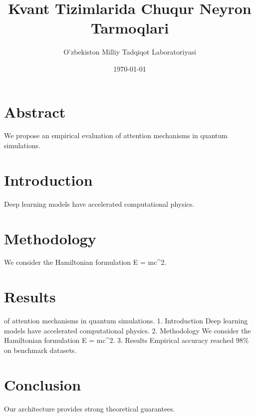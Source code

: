 \documentclass[11pt,a4paper]{article}
\title{Kvant Tizimlarida Chuqur Neyron Tarmoqlari}
\author{O'zbekiston Milliy Tadqiqot Laboratoriyasi}
\date{\today}
\begin{document}
\maketitle

\section{Abstract}

We propose an empirical evaluation of attention mechanisms in quantum simulations.

\section{Introduction}

Deep learning models have accelerated computational physics.

\section{Methodology}

We consider the Hamiltonian formulation E = mc^2.

\section{Results}

of attention mechanisms in quantum simulations.
1. Introduction
Deep learning models have accelerated computational physics.
2. Methodology
We consider the Hamiltonian formulation E = mc^2.
3. Results
Empirical accuracy reached 98\% on benchmark datasets.

\section{Conclusion}

Our architecture provides strong theoretical guarantees.



\end{document}
